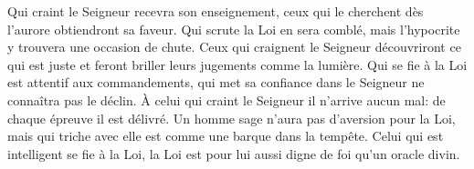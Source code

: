 Qui craint le Seigneur recevra son enseignement,
	ceux qui le cherchent dès l’aurore obtiendront sa faveur.
Qui scrute la Loi en sera comblé,
	mais l’hypocrite y trouvera une occasion de chute.
Ceux qui craignent le Seigneur découvriront ce qui est juste
	et feront briller leurs jugements comme la lumière.
Qui se fie à la Loi est attentif aux commandements,
	qui met sa confiance dans le Seigneur ne connaîtra pas le déclin.
À celui qui craint le Seigneur il n’arrive aucun mal:
	de chaque épreuve il est délivré.
Un homme sage n’aura pas d’aversion pour la Loi,
	mais qui triche avec elle est comme une barque dans la tempête.
Celui qui est intelligent se fie à la Loi,
	la Loi est pour lui aussi digne de foi qu’un oracle divin.
